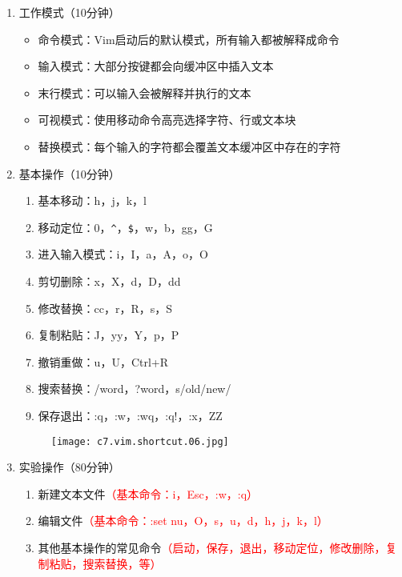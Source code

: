 \documentclass{TIJMUjiaoanSY}
\begin{document}

\firstTail


\newpage
\otherHeader

\noindent
\begin{enumerate}
  \item 工作模式（10分钟）
    \begin{itemize}
      \item 命令模式：Vim启动后的默认模式，所有输入都被解释成命令
      \item 输入模式：大部分按键都会向缓冲区中插入文本
      \item 末行模式：可以输入会被解释并执行的文本
      \item 可视模式：使用移动命令高亮选择字符、行或文本块
      \item 替换模式：每个输入的字符都会覆盖文本缓冲区中存在的字符
    \end{itemize}

  \item 基本操作（10分钟）
    \vspace*{-10pt}
    \begin{multicols}{2}
      \begin{enumerate}
	\item 基本移动：h，j，k，l
	\item 移动定位：0，\verb|^|，\verb|$|，w，b，gg，G
	\item 进入输入模式：i，I，a，A，o，O
	\item 剪切删除：x，X，d，D，dd
	\item 修改替换：cc，r，R，s，S
	\item 复制粘贴：J，yy，Y，p，P
	\item 撤销重做：u，U，Ctrl+R
	\item 搜索替换：/word，?word，s/old/new/
	\item 保存退出：:q，:w，:wq，:q!，:x，ZZ
      \end{enumerate}
    \end{multicols}
    \vspace*{-10pt}
    \begin{figure}[h]
      \centering
      \texttt{[image: c7.vim.shortcut.06.jpg]}
    \end{figure}
    \vspace*{-10pt}

  \item 实验操作（80分钟）
    \begin{enumerate}
      \item 新建文本文件\textcolor{red}{（基本命令：i，Esc，:w，:q）}
      \item 编辑文件\textcolor{red}{（基本命令：:set nu，O，s，u，d，h，j，k，l）}
      \item 其他基本操作的常见命令\textcolor{red}{（启动，保存，退出，移动定位，修改删除，复制粘贴，搜索替换，等）}
    \end{enumerate}
\end{enumerate}

\otherTail
\end{document}
